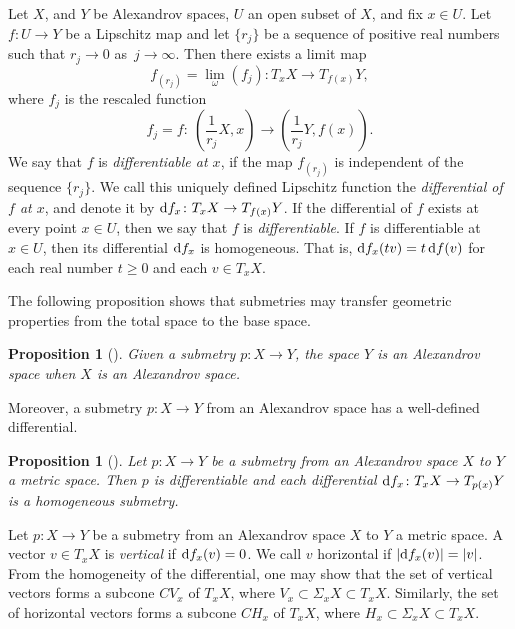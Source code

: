 \documentclass[pdftex]{sigma}
\numberwithin{equation}{section}
\newtheorem{prop}[thm]{Proposition}
\theoremstyle{definition}
\begin{document}
Let $X$, and $Y$ be Alexandrov spaces, $U$ an open subset of $X$, and fix $x\in U$. Let $f\colon U\to Y$ be a Lipschitz map and let
$\{r_j\}$ be a sequence of positive real numbers such that $r_j\to 0$ as~${j\to\infty}$.
Then there exists a limit map
\[
f_{(r_j)} = \lim_\omega (f_j)\colon T_xX \to T_{f(x)}Y,
\]
where $f_j$ is the rescaled function
\[
f_j=f\colon\ \left(\frac{1}{r_j}X,x\right)\to \left(\frac{1}{r_j}Y,f(x)\right).
\]
We say that $f$ is \emph{differentiable at $x$}, if the map $f_{(r_j)}$ is independent of the sequence $\{r_j\}$. We call this uniquely defined Lipschitz function the \emph{differential of $f$ at $x$}, and denote it by ${\rm d}f_x\colon T_xX \to T_{f(x)}Y$. If the differential of $f$ exists at every point $x\in U$, then we say that $f$ is \emph{differentiable}. If $f$ is differentiable at $x\in U$, then its differential ${\rm d}f_x$ is homogeneous. That is, ${\rm d}f_x(tv) = t\,{\rm d}f(v)$ for each real number $t\geq 0$ and each $v\in T_xX$.


The following proposition shows that submetries may transfer geometric properties from the total space to the base space.



\begin{prop}[]
\label{P: if X alex then Y alex}
Given a submetry $p\colon X\to Y$, the space $Y$ is an Alexandrov space when $X$ is an Alexandrov space.
\end{prop}
	
Moreover, a submetry $p\colon X\to Y$ from an Alexandrov space has a well-defined differential.

\begin{prop}[]
Let $p\colon X\to Y$ be a submetry from an Alexandrov space $X$ to $Y$ a metric space. Then $p$ is differentiable and each differential ${\rm d}f_x\colon T_x X\to T_{p(x)} Y$ is a homogeneous submetry.
\end{prop}

Let $p\colon X\to Y$ be a submetry from an Alexandrov space $X$ to $Y$ a metric space. A vector $v\in T_xX$ is \emph{vertical} if ${\rm d}f_x(v)=0$. We call $v$ horizontal if $|{\rm d}f_x(v)|=|v|$. From the homogeneity of the differential, one may show that the set of vertical vectors forms a subcone $CV_x$ of $T_xX$, where $V_x\subset \Sigma_xX\subset T_xX$. Similarly, the set of horizontal vectors forms a subcone $CH_x$ of $T_xX$, where $H_x\subset \Sigma_xX\subset T_xX$.
\end{document}
